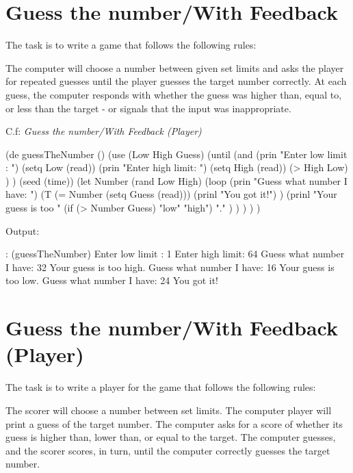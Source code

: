 \pagebreak{}
\section*{Guess the number/With Feedback}

The task is to write a game that follows the following rules:

The computer will choose a number between given set limits and asks the
player for repeated guesses until the player guesses the target number
correctly. At each guess, the computer responds with whether the guess
was higher than, equal to, or less than the target - or signals that the
input was inappropriate.

C.f: \emph{Guess the number/With Feedback (Player)}

\begin{wideverbatim}

(de guessTheNumber ()
   (use (Low High Guess)
      (until
         (and
            (prin "Enter low limit : ")
            (setq Low (read))
            (prin "Enter high limit: ")
            (setq High (read))
            (> High Low) ) )
      (seed (time))
      (let Number (rand Low High)
         (loop
            (prin "Guess what number I have: ")
            (T (= Number (setq Guess (read)))
               (prinl "You got it!") )
            (prinl
               "Your guess is too "
               (if (> Number Guess) "low" "high")
               "." ) ) ) ) )

Output:

: (guessTheNumber)
Enter low limit : 1
Enter high limit: 64
Guess what number I have: 32
Your guess is too high.
Guess what number I have: 16
Your guess is too low.
Guess what number I have: 24
You got it!

\end{wideverbatim}

\pagebreak{}
\section*{Guess the number/With Feedback (Player)}

The task is to write a player for the game that follows the following
rules:

The scorer will choose a number between set limits. The computer player
will print a guess of the target number. The computer asks for a score
of whether its guess is higher than, lower than, or equal to the target.
The computer guesses, and the scorer scores, in turn, until the computer
correctly guesses the target number.

